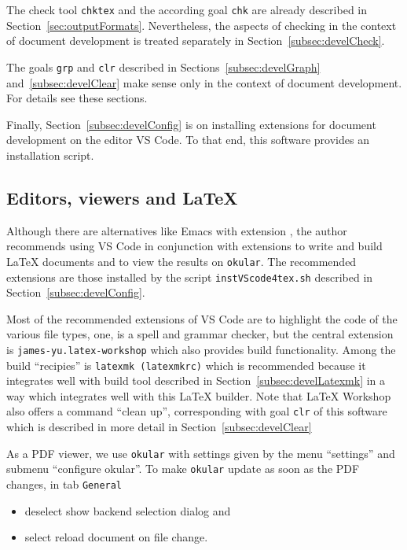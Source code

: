 The check tool \texttt{chktex} and the according goal \texttt{chk} 
are already described in Section~\ref{sec:outputFormats}. 
Nevertheless, the aspects of checking 
in the context of document development is treated separately 
in Section~\ref{subsec:develCheck}. 

The goals \texttt{grp} and \texttt{clr} 
described in Sections~\ref{subsec:develGraph} and~\ref{subsec:develClear} 
make sense only in the context of document development. 
For details see these sections. 

Finally, Section~\ref{subsec:develConfig} 
is on installing extensions for document development on the editor VS Code. 
To that end, this software provides an installation script. 


\subsection{Editors, viewers and \LaTeX}\label{subsec:editViewLatex}

Although there are alternatives like Emacs with extension \auctex, 
the author recommends using VS Code in conjunction with extensions 
to write and build \LaTeX{} documents 
and to view the results on \texttt{okular}. 
The recommended extensions are those 
installed by the script \texttt{instVScode4tex.sh} 
described in Section~\ref{subsec:develConfig}. 

Most of the recommended extensions of VS Code 
are to highlight the code of the various file types, 
one, \ltex{} is a spell and grammar checker, 
but the central extension is \texttt{james-yu.latex-workshop} 
which also provides build functionality. 
Among the build ``recipies'' is \texttt{latexmk (latexmkrc)} 
which is recommended because it integrates well with build tool  
described in Section~\ref{subsec:develLatexmk} 
in a way which integrates  well with this \LaTeX{} builder. 
Note that \LaTeX{} Workshop also offers a command ``clean up'', 
corresponding with goal \texttt{clr} of this software 
which is described in more detail in Section~\ref{subsec:develClear}

As a PDF viewer, we use \texttt{okular} 
with settings given by the menu ``settings'' 
and submenu ``configure okular''. 
To make \texttt{okular} update as soon as the PDF changes, 
in tab \texttt{General} 
\begin{itemize}
  \item deselect show backend selection dialog and 
  \item select reload document on file change. 
\end{itemize}


